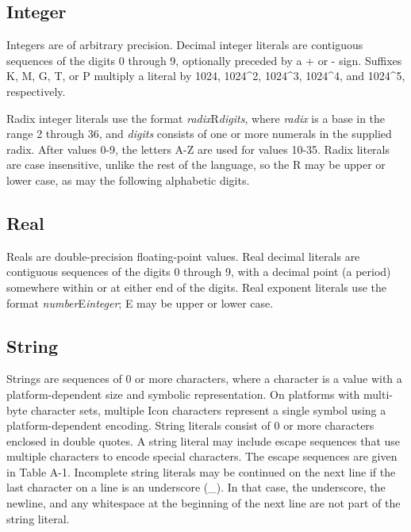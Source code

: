 \subsection*{Integer}

Integers are of arbitrary precision. Decimal integer
literals are contiguous sequences of the digits 0 through 9, optionally
preceded by a + or - sign.  Suffixes K, M, G, T, or P multiply
a literal by 1024, 1024\^{}2, 1024\^{}3, 1024\^{}4, and
1024\^{}5, respectively.

Radix integer literals use the format
\textit{radix}R\textit{digits}, where \textit{radix} is a base in the
range 2 through 36, and \textit{digits} consists of one or more
numerals in the supplied radix. After values 0-9, the letters A-Z are
used for values 10-35. Radix literals are case insensitive, unlike the
rest of the language, so the R may be upper or lower case, as may the
following alphabetic digits.

\subsection*{Real}

Reals are double-precision floating-point values.
Real decimal literals are contiguous sequences of the digits 0 through
9, with a decimal point (a period) somewhere within or at either end of
the digits. Real exponent literals use the format
\textit{number}E\textit{integer}; E may be upper or lower case.

\subsection*{String}

Strings are sequences of 0 or more characters, where a
character is a value with a platform-dependent size and symbolic
representation. On platforms with multi-byte character sets, multiple
Icon characters represent a single symbol using a platform-dependent
encoding.
String literals consist of 0 or more characters enclosed in double
quotes. A string literal may include escape sequences that use multiple
characters to encode special characters. The escape sequences are given
in Table A-1. Incomplete string literals may
be continued on the next line if the last character on a line is an
underscore (\_). In that case, the underscore, the newline, and any
whitespace at the beginning of the next line are not part of the string
literal.

